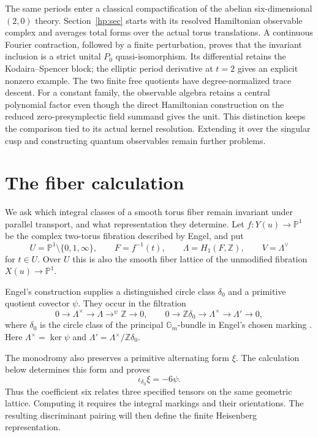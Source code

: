 \documentclass[11pt]{article}
\numberwithin{equation}{section}
\begin{document}
The same periods enter a classical compactification of the abelian
six-dimensional $(2,0)$ theory. Section~\ref{hp:sec} starts with
its resolved Hamiltonian observable complex and averages total
forms over the actual torus translations. A continuous Fourier
contraction, followed by a finite perturbation, proves that the
invariant inclusion is a strict unital $P_0$ quasi-isomorphism.
Its differential retains the Kodaira--Spencer block; the elliptic
period derivative at $t=2$ gives an explicit nonzero example.
The two finite free quotients have degree-normalized trace
descent. For a constant family, the observable algebra retains
a central polynomial factor even though the direct Hamiltonian
construction on the reduced zero-presymplectic field summand
gives the unit. This distinction keeps the comparison tied to
its actual kernel resolution. Extending it over the singular
cusp and constructing quantum observables remain further problems.

\section{The fiber calculation}

We ask which integral classes of a smooth torus fiber remain invariant
under parallel transport, and what representation they determine.
Let $f:Y(u)\to\mathbb P^1$ be the complex two-torus fibration described by
Engel, and put
\[
 U=\mathbb P^1\setminus\{0,1,\infty\},\qquad
 F=f^{-1}(t),\qquad \Lambda=H_1(F,\mathbb Z),\qquad
 V=\Lambda^\vee
\]
for $t\in U$. Over $U$ this is also the smooth fiber lattice of the
unmodified fibration $X(u)\to\mathbb P^1$.

Engel's construction supplies a distinguished circle class $\delta_0$
and a primitive quotient covector $\psi$. They occur in the filtration
\[
 0\longrightarrow\Lambda^\times\longrightarrow\Lambda
   \mathrel{\mathop{\longrightarrow}^{\psi}}\mathbb Z\longrightarrow0,
 \qquad
 0\longrightarrow\mathbb Z\delta_0\longrightarrow\Lambda^\times
   \longrightarrow\Lambda'\longrightarrow0,                 \tag{1.1}
\]
where $\delta_0$ is the circle class of the principal
$\mathbb G_m$-bundle in Engel's chosen marking
\cite[Sections 2 and 5]{Engel}.
Here $\Lambda^\times=\ker\psi$ and
$\Lambda'=\Lambda^\times/\mathbb Z\delta_0$.

The monodromy also preserves a primitive alternating form $\xi$.
The calculation below determines this form and proves
\[
                         \iota_{\delta_0}\xi=-6\psi.       \tag{1.2}
\]
Thus the coefficient six relates three specified tensors on the same
geometric lattice. Computing it requires the integral markings and their
orientations. The resulting discriminant pairing will then define the
finite Heisenberg representation.
\end{document}

